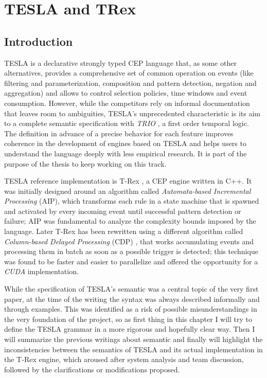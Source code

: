 \chapter{TESLA and TRex}
\label{chap:tesla-trex}

\section{Introduction}

TESLA \cite{tesla} is a declarative strongly typed CEP language that, as some other alternatives, provides a comprehensive set of common operation on events (like filtering and parameterization, composition and pattern detection, negation and aggregation) and allows to control selection policies, time windows and event consumption. However, while the competitors rely on informal documentation that leaves room to ambiguities, TESLA's unprecedented characteristic is its aim to a complete semantic specification with \emph{TRIO} \cite{trio}, a first order temporal logic. The definition in advance of a precise behavior for each feature improves coherence in the development of engines based on TESLA and helps users to understand the language deeply with less empirical research. It is part of the purpose of the thesis to keep working on this track.

TESLA reference implementation is T-Rex \cite{trex}, a CEP engine written in C++. It was initially designed around an algorithm called \emph{Automata-based Incremental Processing} (AIP), which transforms each rule in a state machine that is spawned and activated by every incoming event until successful pattern detection or failure; AIP was fundamental to analyze the complexity bounds imposed by the language. Later T-Rex has been rewritten using a different algorithm called \emph{Column-based Delayed Processing} (CDP) \cite{trex-cuda}, that works accumulating events and processing them in batch as soon as a possible trigger is detected; this technique was found to be faster and easier to parallelize and offered the opportunity for a \emph{CUDA} implementation.

While the specification of TESLA's semantic was a central topic of the very first paper, at the time of the writing the syntax was always described informally and through examples. This was identified as a risk of possible misunderstandings in the very foundation of the project, so as first thing in this chapter I will try to define the TESLA grammar in a more rigorous and hopefully clear way. Then I will summarize the previous writings about semantic and finally will highlight the inconsistencies between the semantics of TESLA and its actual implementation in the T-Rex engine, which aroused after system analysis and team discussion, followed by the clarifications or modifications proposed.

